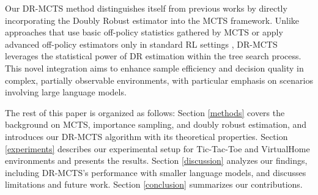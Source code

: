 Our DR-MCTS method distinguishes itself from previous works by directly incorporating the Doubly Robust estimator into the MCTS framework. Unlike approaches that use basic off-policy statistics gathered by MCTS \cite{borges2021combiningonpolicytrainingmodelbased} or apply advanced off-policy estimators only in standard RL settings \cite{jiang2016doubly, thomas2016data, farajtabar2018more, kallus2020double}, DR-MCTS leverages the statistical power of DR estimation within the tree search process. This novel integration aims to enhance sample efficiency and decision quality in complex, partially observable environments, with particular emphasis on scenarios involving large language models.


The rest of this paper is organized as follows: Section \ref{methods} covers the background on MCTS, importance sampling, and doubly robust estimation, and introduces our DR-MCTS algorithm with its theoretical properties. Section \ref{experiments} describes our experimental setup for Tic-Tac-Toe and VirtualHome environments and presents the results. Section \ref{discussion} analyzes our findings, including DR-MCTS's performance with smaller language models, and discusses limitations and future work. Section \ref{conclusion} summarizes our contributions.